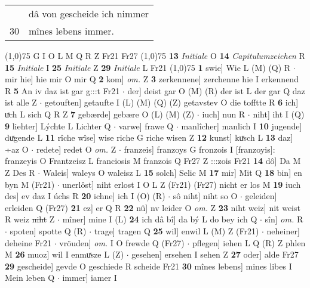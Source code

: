 \documentclass[8pt,a4paper,notitlepage]{article}
\begin{document}
\begin{table}[ht]
\begin{minipage}[t]{0.5\linewidth}
\begin{tabular}{rl}
 & dâ von gescheide ich nimmer\\ 
30 & mînes lebens immer.\\ 
\end{tabular}
\scriptsize
\line(1,0){75} \newline
G I O L M Q R Z Fr21 Fr27 \newline
\line(1,0){75} \newline
\textbf{13} \textit{Initiale} O  \textbf{14} \textit{Capitulumzeichen} R  \textbf{15} \textit{Initiale} I  \textbf{25} \textit{Initiale} Z  \textbf{29} \textit{Initiale} L Fr21  \newline
\line(1,0){75} \newline
\textbf{1} swie] Wie L (M) (Q) R  $\cdot$ mir hie] hie mir O mir Q \textbf{2} kom] \textit{om.} Z \textbf{3} zerkennene] zerchenne hie I erkennend R \textbf{5} An iv daz ist gar g:::t Fr21  $\cdot$ der] deist gar O (M) (R) der ist L der gar Q daz ist alle Z  $\cdot$ getouften] getaufte I (L) (M) (Q) (Z) getavstev O die tofftte R \textbf{6} ich] uͯch L sich Q R Z \textbf{7} gebærde] gebære O (L) (M) (Z)  $\cdot$ iuch] nun R  $\cdot$ niht] iht I (Q) \textbf{9} liehter] Lýchte L Lichter Q  $\cdot$ varwe] frawe Q  $\cdot$ manlîcher] manlich I \textbf{10} jugende] duͯgende L \textbf{11} rîche wîse] wise riche G riche wisen Z \textbf{12} kunst] kuͯsch L \textbf{13} daz] ÷az O  $\cdot$ redete] redet O \textit{om.} Z  $\cdot$ franzeis] franzoys G fronzois I [franzoyis]: franzeyis O Frantzeisz L franciosis M franzois Q Fr27 Z :::zois Fr21 \textbf{14} dô] Da M Z Des R  $\cdot$ Waleis] waleys O waleisz L \textbf{15} solch] Selic M \textbf{17} mir] Mit Q \textbf{18} bin] en byn M (Fr21)  $\cdot$ unerlôst] niht erlost I O L Z (Fr21) (Fr27) nicht er los M \textbf{19} iuch des] ev daz I úchs R \textbf{20} ichne] ich I (O) (R)  $\cdot$ sô niht] niht so O  $\cdot$ geleiden] erleiden Q (Fr27) \textbf{21} ez] er Q R \textbf{22} nû] nv leider O \textit{om.} Z \textbf{23} niht weiz] nit weist R weiz \sout{niht} Z  $\cdot$ mîner] mine I (L) \textbf{24} ich dâ bî] da bý L do bey ich Q  $\cdot$ sîn] \textit{om.} R  $\cdot$ spoten] spotte Q (R)  $\cdot$ trage] tragen Q \textbf{25} wil] enwil L (M) Z (Fr21)  $\cdot$ neheiner] deheine Fr21  $\cdot$ vröuden] \textit{om.} I O frewde Q (Fr27)  $\cdot$ pflegen] iehen L Q (R) Z phlen M \textbf{26} muoz] wil I enmuͯsze L (Z)  $\cdot$ gesehen] ersehen I sehen Z \textbf{27} oder] alde Fr27 \textbf{29} gescheide] gevde O geschiede R scheide Fr21 \textbf{30} mînes lebens] mines libes I Mein leben Q  $\cdot$ immer] iamer I \newline

\end{minipage}
\end{table}
\end{document}
